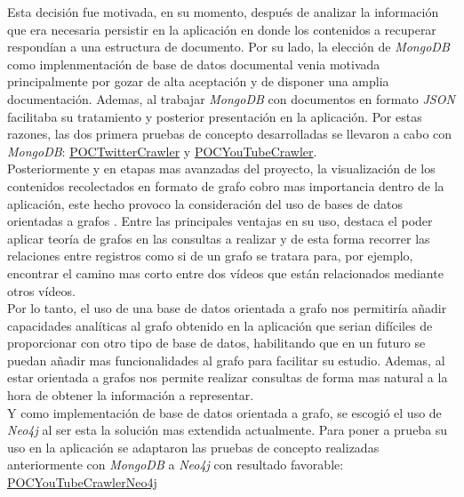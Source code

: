 \documentclass[11pt,a4paper]{article}
\begin{document}
Esta decisión fue motivada, en su momento, después de analizar la información que era necesaria persistir en la aplicación en donde los contenidos a recuperar respondían a una estructura de documento. Por su lado, la elección de \textit{MongoDB} como implenmentación de base de datos documental venia motivada principalmente por gozar de alta aceptación y de disponer una amplia documentación. Ademas, al trabajar \textit{MongoDB} con documentos en formato \textit{JSON} facilitaba su tratamiento y posterior presentación en la aplicación. Por estas razones, las dos primera pruebas de concepto desarrolladas se llevaron a cabo con \textit{MongoDB}: \href{https://github.com/jsanchezmend/TFGAntivacunas/tree/master/POCTwitterCrawler}{POCTwitterCrawler} y \href{https://github.com/jsanchezmend/TFGAntivacunas/tree/master/POCYouTubeCrawler}{POCYouTubeCrawler}.
\\

Posteriormente y en etapas mas avanzadas del proyecto, la visualización de los contenidos recolectados en formato de grafo cobro mas importancia dentro de la aplicación, este hecho provoco la consideración del uso de bases de datos orientadas a grafos \cite{38}. Entre las principales ventajas en su uso, destaca el poder  aplicar teoría de grafos en las consultas a realizar y de esta forma recorrer las relaciones entre registros como si de un grafo se tratara para, por ejemplo, encontrar el camino mas corto entre dos vídeos que están relacionados mediante otros vídeos.
\\

Por lo tanto, el uso de una base de datos orientada a grafo nos permitiría añadir capacidades analíticas al  grafo obtenido en la aplicación que serian difíciles de proporcionar con otro tipo de base de datos, habilitando que en un futuro se puedan añadir mas funcionalidades al grafo para facilitar su estudio. Ademas, al estar orientada a grafos nos permite realizar consultas de forma mas natural a la hora de obtener la información a representar.
\\

Y como implementación de base de datos orientada a grafo, se escogió el uso de \textit{Neo4j} al ser esta la solución mas extendida actualmente. Para poner a prueba su uso en la aplicación se adaptaron las pruebas de concepto realizadas anteriormente con \textit{MongoDB} a \textit{Neo4j} con resultado favorable: \href{https://github.com/jsanchezmend/TFGAntivacunas/tree/master/POCYouTubeCrawlerNeo4j}{POCYouTubeCrawlerNeo4j}
\\
\end{document}
